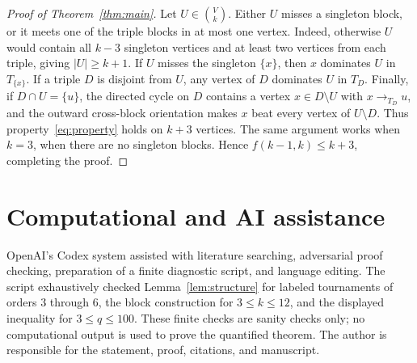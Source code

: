\documentclass[11pt]{article}
\begin{document}
\begin{proof}[Proof of Theorem~\ref{thm:main}]
Let $U\in\binom{V}{k}$.  Either $U$ misses a singleton block, or it
meets one of the triple blocks in at most one vertex.  Indeed, otherwise
$U$ would contain all $k-3$ singleton vertices and at least two vertices
from each triple, giving $|U|\geq k+1$.  If $U$ misses the singleton
$\{x\}$, then $x$ dominates $U$ in $T_{\{x\}}$.  If a triple $D$ is
disjoint from $U$, any vertex of $D$ dominates $U$ in $T_D$.  Finally, if
$D\cap U=\{u\}$, the directed cycle on $D$ contains a vertex
$x\in D\setminus U$ with $x\to_{T_D}u$, and the outward cross-block
orientation makes $x$ beat every vertex of $U\setminus D$.  Thus
property~\eqref{eq:property} holds on $k+3$ vertices.  The same argument
works when $k=3$, when there are no singleton blocks.  Hence
$f(k-1,k)\leq k+3$, completing the proof.
\end{proof}

\section*{Computational and AI assistance}

OpenAI's Codex system assisted with literature searching, adversarial proof
checking, preparation of a finite diagnostic script, and language editing.
The script exhaustively checked Lemma~\ref{lem:structure} for labeled
tournaments of orders $3$ through $6$, the block construction for
$3\leq k\leq12$, and the displayed inequality for $3\leq q\leq100$.
These finite checks are sanity checks only; no computational output is used
to prove the quantified theorem.  The author is responsible for the
statement, proof, citations, and manuscript.



\end{document}
